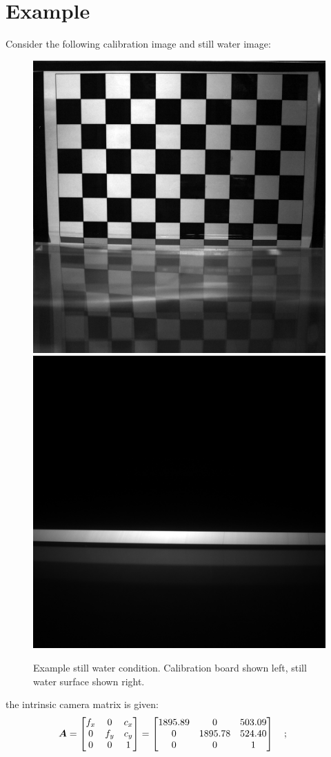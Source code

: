 \section{Example}
\par
Consider the following calibration image and still water image:
\begin{figure}[H]
	\centering
	\includegraphics[width=0.45 \linewidth]{../images/depth-example-calib.png}
	\includegraphics[width=0.45 \linewidth]{../images/depth-example-LIF.png}
	\caption{Example still water condition.
		Calibration board shown left, still water surface shown right.}
	\label{fig:depth_example}
\end{figure}
the intrinsic camera matrix is given:
\begin{gather*}
	\boldsymbol{A} =
	\begin{bmatrix}
	f_x & 0 & c_x \\
	0 & f_y & c_y \\
	0 & 0 & 1 \\
	\end{bmatrix}
	=
	\begin{bmatrix}
	1895.89 & 0 & 503.09 \\
	0 & 1895.78 & 524.40 \\
	0 & 0 & 1 \\
	\end{bmatrix}
	\text{\quad ; \quad}
\end{gather*}
